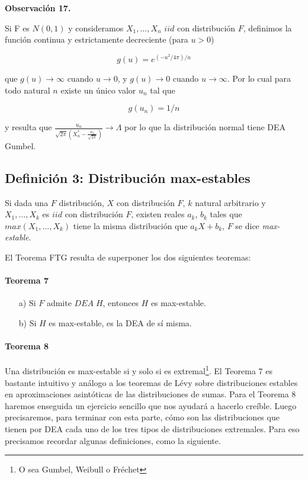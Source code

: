 \documentclass[
  oneside]{book}
\begin{document}
\textbf{Observación 17.}

Si F es \(N(0,1)\) y consideramos \(X_1,...,X_n\) \(iid\) con
distribución \(F\), definimos la función continua y estrictamente
decreciente (para \(u>0\))

\[
g(u)=e^{(-u^2/4\pi)/u}
\]

que \(g(u)\rightarrow \infty\) cuando \(u\rightarrow 0\), y
\(g(u)\rightarrow 0\) cuando \(u\rightarrow \infty\). Por lo cual para
todo natural \(n\) existe un único valor \(u_n\) tal que

\[
g(u_n)=1/n
\]

y resulta que
\(\frac{u_n}{\sqrt{2\pi}\left (X_n^*-\frac{u_n}{\sqrt{2\pi}}\right )}\longrightarrow \Lambda\)
por lo que la distribución normal tiene DEA Gumbel.

\hypertarget{definiciuxf3n-3-distribuciuxf3n-max-estables}{%
\subsection{Definición 3: Distribución
max-estables}\label{definiciuxf3n-3-distribuciuxf3n-max-estables}}

Si dada una \(F\) distribución, \(X\) con distribución \(F\), \(k\)
natural arbitrario y \(X_1,...,X_k\) es \(iid\) con distribución \(F\),
existen reales \(a_k\), \(b_k\) tales que \(max(X_1,...,X_k)\) tiene la
misma distribución que \(a_k X+ b_k\), \(F\) se dice
\textit{max-estable}.

El Teorema FTG resulta de superponer los dos siguientes teoremas:

\hypertarget{teorema-7}{%
\paragraph{Teorema 7}\label{teorema-7}}

\begin{itemize}
  \item[a)] Si $F$ admite $DEA\;H$, entonces $H$ es max-estable.
  \item[b)] Si $H$ es max-estable, es la DEA de sí misma.
\end{itemize}

\hypertarget{teorema-8}{%
\paragraph{Teorema 8}\label{teorema-8}}

Una distribución es max-estable si y solo si es
extremal\footnote{O sea Gumbel, Weibull o Fréchet}. El Teorema 7 es
bastante intuitivo y análogo a los teoremas de Lévy sobre distribuciones
estables en aproximaciones asintóticas de las distribuciones de sumas.
Para el Teorema 8 haremos enseguida un ejercicio sencillo que nos
ayudará a hacerlo creíble. Luego precisaremos, para terminar con esta
parte, cómo son las distribuciones que tienen por DEA cada uno de los
tres tipos de distribuciones extremales. Para eso precisamos recordar
algunas definiciones, como la siguiente.
\end{document}
